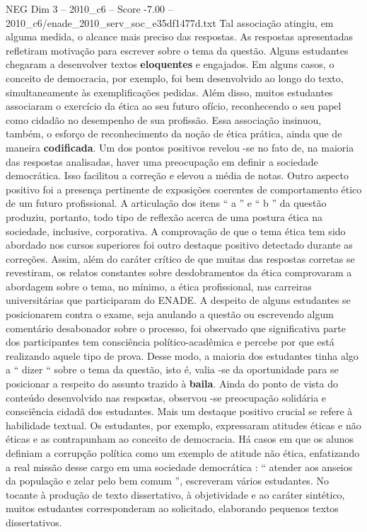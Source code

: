 \begin{textsample}{NEG Dim 3 – 2010\_c6 – Score -7.00 – 2010\_c6/enade\_2010\_serv\_soc\_e35df1477d.txt}
Tal associação atingiu, em alguma medida, o alcance mais preciso das respostas.
As respostas apresentadas refletiram motivação para escrever sobre o tema da questão.
Alguns estudantes chegaram a desenvolver textos \textbf{eloquentes} e engajados.
Em alguns casos, o conceito de democracia, por exemplo, foi bem desenvolvido ao longo do texto, simultaneamente às exemplificações pedidas.
Além disso, muitos estudantes associaram o exercício da ética ao seu futuro ofício, reconhecendo o seu papel como cidadão no desempenho de sua profissão.
Essa associação insinuou, também, o esforço de reconhecimento da noção de ética prática, ainda que de maneira \textbf{codificada}.
Um dos pontos positivos revelou -se no fato de, na maioria das respostas analisadas, haver uma preocupação em definir a sociedade democrática.
Isso facilitou a correção e elevou a média de notas.
Outro aspecto positivo foi a presença pertinente de exposições coerentes de comportamento ético de um futuro profissional.
A articulação dos itens “ a ” e “ b ” da questão produziu, portanto, todo tipo de reflexão acerca de uma postura ética na sociedade, inclusive, corporativa.
A comprovação de que o tema ética tem sido abordado nos cursos superiores foi outro destaque positivo detectado durante as correções.
Assim, além do caráter crítico de que muitas das respostas corretas se revestiram, os relatos constantes sobre desdobramentos da ética comprovaram a abordagem sobre o tema, no mínimo, a ética profissional, nas carreiras universitárias que participaram do ENADE.
A despeito de alguns estudantes se posicionarem contra o exame, seja anulando a questão ou escrevendo algum comentário desabonador sobre o processo, foi observado que significativa parte dos participantes tem consciência político-acadêmica e percebe por que está realizando aquele tipo de prova.
Desse modo, a maioria dos estudantes tinha algo a “ dizer “ sobre o tema da questão, isto é, valia -se da oportunidade para se posicionar a respeito do assunto trazido à \textbf{baila}.
Ainda do ponto de vista do conteúdo desenvolvido nas respostas, observou -se preocupação solidária e consciência cidadã dos estudantes.
Mais um destaque positivo crucial se refere à habilidade textual.
Os estudantes, por exemplo, expressaram atitudes éticas e não éticas e as contrapunham ao conceito de democracia.
Há casos em que os alunos definiam a corrupção política como um exemplo de atitude não ética, enfatizando a real missão desse cargo em uma sociedade democrática : “ atender aos anseios da população e zelar pelo bem comum ”, escreveram vários estudantes.
No tocante à produção de texto dissertativo, à objetividade e ao caráter sintético, muitos estudantes corresponderam ao solicitado, elaborando pequenos textos dissertativos.

\end{textsample}
